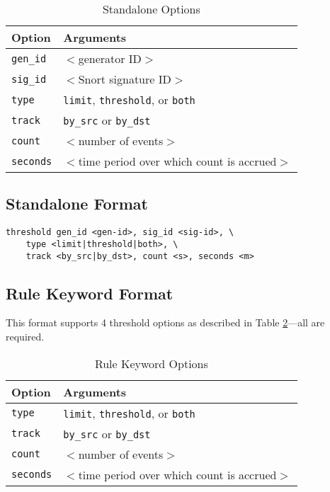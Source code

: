 \documentclass[english]{report}
\begin{document}
\begin{table}[!htbp]
\caption{Standalone Options\label{standalone_options}}
\begin{center}\begin{tabular}{| l | p{3.5in} |}
\hline
\textbf{Option} & \textbf{Arguments}\\
\hline
\hline
\texttt{gen\_id} & $<$generator ID$>$\\
\hline
\texttt{sig\_id} & $<$Snort signature ID$>$ \\
\hline
\texttt{type} & \texttt{limit}, \texttt{threshold}, or \texttt{both} \\
\hline
\texttt{track} & \texttt{by\_src} or \texttt{by\_dst} \\
\hline
\texttt{count} & $<$number of events$>$ \\
\hline
\texttt{seconds} & $<$time period over which count is accrued$>$ \\
\hline
\end{tabular}\end{center}
\end{table}

\subsection{Standalone Format}
\begin{verbatim}
threshold gen_id <gen-id>, sig_id <sig-id>, \
    type <limit|threshold|both>, \
    track <by_src|by_dst>, count <s>, seconds <m>  
\end{verbatim}


\subsection{Rule Keyword Format}

This format supports 4 threshold options as described in Table \ref{rule_keyword_options}---all are required.

\begin{table}[!hbpt]
\caption{Rule Keyword Options\label{rule_keyword_options}}
\begin{center}\begin{tabular}{| l | p{3.5in} |}
\hline
\textbf{Option} & \textbf{Arguments}\\
\hline
\hline
\texttt{type} & \texttt{limit}, \texttt{threshold}, or \texttt{both} \\
\hline
\texttt{track} & \texttt{by\_src} or \texttt{by\_dst} \\
\hline
\texttt{count} & $<$number of events$>$ \\
\hline
\texttt{seconds} & $<$time period over which count is accrued$>$ \\
\hline
\end{tabular}\end{center}
\end{table}
\end{document}
